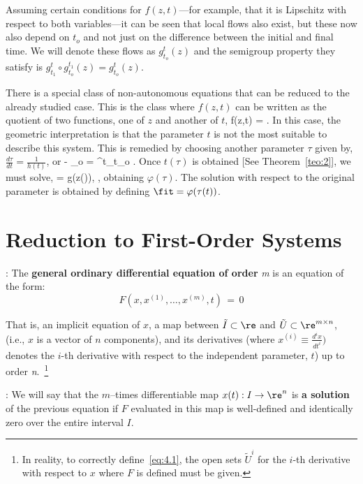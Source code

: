 Assuming certain conditions for $f(z,t) $---for example, that it is
Lipschitz with respect to both variables---it can be seen that local
flows also exist, but these now also depend on $t_o $ and not just
on the difference between the initial and final time. We will denote
these flows as $g^t_{t_o}(z)$ and the semigroup property they satisfy is
$g^{t}_{t_1} \circ g^{t_1}_{t_o} (z) = g^t_{t_o} (z) $.

There is a special class of non-autonomous equations that can be reduced
to the already studied case. This is the class where $f(z,t)$ can be written as
the quotient of two functions, one of $z$ and another of $t$,
\beq 
f(z,t) =  .
\eeq
In this case, the geometric interpretation is that the parameter $t$
is not the most suitable to describe this system. This is remedied by choosing
another parameter $\tau $ given by, $\frac{d\tau}{dt} = \frac1{h(t)}$, or 
\beq 
\tau - \tau_o = \int^t_{t_o} . 
\eeq
Once $t(\tau) $ is obtained [See Theorem~\ref{teo:2}], we must solve,
\beq 
{} = g(z(\tau )), 
, obtaining $\varphi(\tau) $.
The solution with respect to the original parameter is obtained 
by defining $\fit = \varphi(\tau(t)) $.

\section{Reduction to First-Order Systems}

: The {\bf general ordinary differential equation of order} {\it m} 
is an equation of the form:
\begin{equation}
F(x,x^{(1)},\ldots,x^{(m)},t)\,=\,0     \label{eq:4.1}
\end{equation}
\noindent 

That is, an implicit equation of $x$, a map between 
$\tilde I\subset \re$ and $\tilde U\subset \re^{m \times n}$, (i.e., $x$ is a
vector of $n$ components), and its derivatives (where $x^{(i)} \equiv \frac{d^i x}{dt^i})$ 
denotes the $i$-th derivative with respect to the independent parameter, $t$) 
up to order 
{\it n}.~\footnote{In reality, to correctly define~\ref{eq:4.1}, the open sets $\tilde U^i$ for the $i$-th derivative with respect 
to $x$ where $F$ is defined must be given.}

: We will say that the $m$--times differentiable map $x(t): I \to
\re^n$ is {\bf a solution} of the previous equation if $F$
evaluated in this map is well-defined and identically zero over 
the entire interval $I$.

